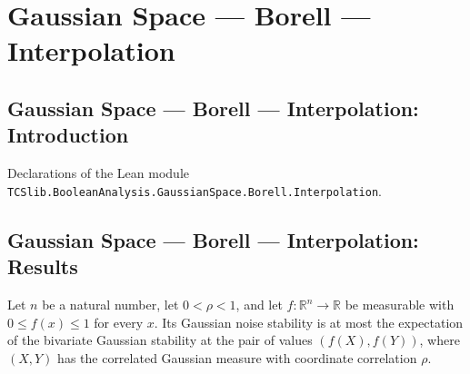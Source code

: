 \section{Gaussian Space --- Borell --- Interpolation}
\subsection*{Gaussian Space --- Borell --- Interpolation: Introduction}

Declarations of the Lean module \texttt{TCSlib.BooleanAnalysis.GaussianSpace.Borell.Interpolation}.

\subsection*{Gaussian Space --- Borell --- Interpolation: Results}

\begin{theorem}
\label{BooleanAnalysis.GaussianSpace.gaussianNoiseStability_le_bivariate_integral}
\leanok
{}
Let $n$ be a natural number, let $0<\rho<1$, and let $f:\mathbb R^n\to\mathbb R$ be
measurable with $0\le f(x)\le1$ for every $x$. Its Gaussian noise stability is at most
the expectation of the bivariate Gaussian stability at the pair of values $(f(X),f(Y))$,
where $(X,Y)$ has the correlated Gaussian measure with coordinate correlation $\rho$.
\end{theorem}
